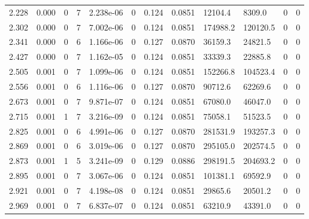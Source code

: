 \documentclass[preview]{standalone}
\begin{document}
{{\begin{tabular}{L{1.2cm}C{1.2cm} C{0.3cm}C{0.5cm} C{1.4cm}C{1.4cm} C{1.4cm}C{1.4cm} C{1.6cm}C{1.6cm} C{1.6cm}C{1.6cm}}
  2.228  &  0.000  & 0     &  7 &  2.238e-06  & 0  &  0.124&   0.0851& 12104.4 & 8309.0   &  0 & 0  \\ 
  2.302  &  0.000  & 0     &  7 &  7.002e-06  & 0  &  0.124&   0.0851& 174988.2 & 120120.5   &  0 & 0  \\ 
  2.341  &  0.000  & 0     &  6 &  1.166e-06  & 0  &  0.127&   0.0870& 36159.3 & 24821.5   &  0 & 0  \\ 
  2.427  &  0.000  & 0     &  7 &  1.162e-05  & 0  &  0.124&   0.0851& 33339.3 & 22885.8   &  0 & 0  \\ 
  2.505  &  0.001  & 0     &  7 &  1.099e-06  & 0  &  0.124&   0.0851& 152266.8 & 104523.4   &  0 & 0  \\ 
  2.556  &  0.001  & 0     &  6 &  1.116e-06  & 0  &  0.127&   0.0870& 90712.6 & 62269.6   &  0 & 0  \\ 
  2.673  &  0.001  & 0     &  7 &  9.871e-07  & 0  &  0.124&   0.0851& 67080.0 & 46047.0   &  0 & 0  \\ 
  2.715  &  0.001  & 1     &  7 &  3.216e-09  & 0  &  0.124&   0.0851& 75058.1 & 51523.5   &  0 & 0  \\ 
  2.825  &  0.001  & 0     &  6 &  4.991e-06  & 0  &  0.127&   0.0870& 281531.9 & 193257.3   &  0 & 0  \\ 
  2.869  &  0.001  & 0     &  6 &  3.019e-06  & 0  &  0.127&   0.0870& 295105.0 & 202574.5   &  0 & 0  \\ 
  2.873  &  0.001  & 1     &  5 &  3.241e-09  & 0  &  0.129&   0.0886& 298191.5 & 204693.2   &  0 & 0  \\ 
  2.895  &  0.001  & 0     &  7 &  3.067e-06  & 0  &  0.124&   0.0851& 101381.1 & 69592.9   &  0 & 0  \\ 
  2.921  &  0.001  & 0     &  7 &  4.198e-08  & 0  &  0.124&   0.0851& 29865.6 & 20501.2   &  0 & 0  \\ 
  2.969  &  0.001  & 0     &  7 &  6.837e-07  & 0  &  0.124&   0.0851& 63210.9 & 43391.0   &  0 & 0  \\ 
\hline 
\end{tabular} 

}}
\end{document}

